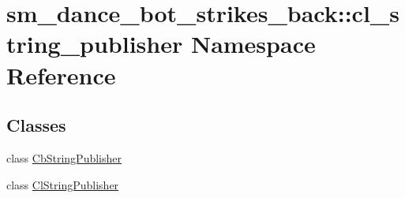 \hypertarget{namespacesm__dance__bot__strikes__back_1_1cl__string__publisher}{}\section{sm\+\_\+dance\+\_\+bot\+\_\+strikes\+\_\+back\+:\+:cl\+\_\+string\+\_\+publisher Namespace Reference}
\label{namespacesm__dance__bot__strikes__back_1_1cl__string__publisher}
\subsection*{Classes}
\begin{DoxyCompactItemize}
\item 
class \hyperlink{classsm__dance__bot__strikes__back_1_1cl__string__publisher_1_1CbStringPublisher}{Cb\+String\+Publisher}
\item 
class \hyperlink{classsm__dance__bot__strikes__back_1_1cl__string__publisher_1_1ClStringPublisher}{Cl\+String\+Publisher}
\end{DoxyCompactItemize}
